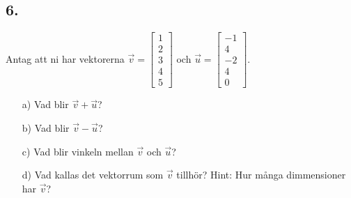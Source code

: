 \documentclass{article}
\begin{document}
\subsection*{6.}
Antag att ni har vektorerna $\vec{v}=\begin{bmatrix}1 \\ 2 \\ 3 \\ 4 \\ 5 \end{bmatrix}$ och $\vec{u}=\begin{bmatrix}-1 \\ 4 \\ -2 \\ 4 \\ 0 \end{bmatrix}$.
\begin{itemize}
\item[a) ] Vad blir $\vec{v}+\vec{u}$?
\item[b) ] Vad blir $\vec{v}-\vec{u}$?
\item[c) ] Vad blir vinkeln mellan $\vec{v}$ och $\vec{u}$?
\item[d) ] Vad kallas det vektorrum som $\vec{v}$ tillhör? Hint: Hur många dimmensioner har $\vec{v}$? 
\end{itemize}
\end{document}
